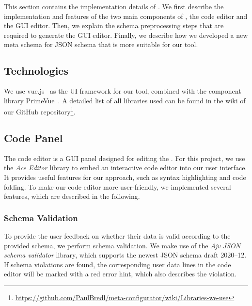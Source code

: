This section contains the implementation details of \toolname{}.
We first describe the implementation and features of the two main components of \toolname{}, the code editor and the GUI editor.
Then, we explain the schema preprocessing steps that are required to generate the GUI editor.
Finally, we describe how we developed a new meta schema for JSON schema that is more suitable for our tool.

\subsection{Technologies}\label{subsec:technologies}

We use vue.js~\cite{vuejsVuejsProgressive} as the UI framework for our tool, combined with the component library PrimeVue~\cite{primevuePrimeVueComponent}.
A detailed list of all libraries used can be found in the wiki of our GitHub repository\footnote{\url{https://github.com/PaulBredl/meta-configurator/wiki/Libraries-we-use}}.




\subsection{Code Panel}\label{subsec:code-editor}

The code editor is a GUI panel designed for editing the \cfgfiles.
For this project, we use the \textit{Ace Editor}\cite{Ace-Editor} library to embed an interactive code editor into our user interface.
It provides useful features for our approach, such as syntax highlighting and code folding.
To make our code editor more user-friendly, we implemented several features, which are described in the following.

\subsubsection{Schema Validation}
To provide the user feedback on whether their data is valid according to the provided schema, we perform schema validation.
We make use of the \textit{Ajv JSON schema validator}\cite{ajv-validator} library, which supports the newest JSON schema draft 2020--12.
If schema violations are found, the corresponding user data lines in the code editor will be marked with a red error hint, which also describes the violation.


